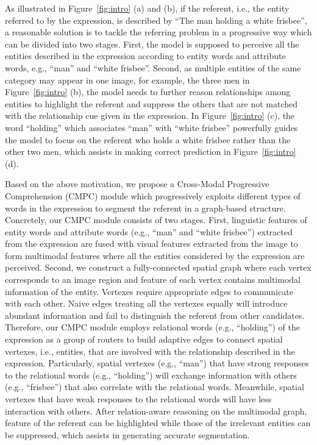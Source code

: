 \documentclass[10pt,twocolumn,letterpaper]{article}
\begin{document}
As illustrated in Figure~\ref{fig:intro} (a) and (b), 
if the referent, i.e., the entity referred to by the expression, is described by 
``The man holding a white frisbee'', a reasonable solution is to tackle the referring 
problem in a progressive way which can be divided into two stages. First, the model is supposed to 
perceive all the entities described in the expression according to entity words and 
attribute words, e.g., ``man'' and ``white frisbee''. Second, as multiple entities of the 
same category may appear in one image, for example, the three men in Figure~\ref{fig:intro} (b), 
the model needs to further reason relationships among entities to highlight the referent 
and suppress the others that are not matched with the relationship cue given in the expression. 
In Figure~\ref{fig:intro} (c), the word ``holding'' which associates ``man'' with ``white frisbee'' 
powerfully guides the model to focus on the referent who holds a white frisbee rather than the other two men, which assists in making correct prediction in Figure~\ref{fig:intro} (d).

Based on the above motivation, we propose a Cross-Modal Progressive Comprehension (CMPC) 
module which progressively exploits different types of words in the expression to segment the referent 
in a graph-based structure. Concretely, our CMPC module consists of two stages. 
First, linguistic features of entity words and attribute words 
(e.g., ``man'' and ``white frisbee'') extracted from 
the expression are fused with visual features extracted from the image to form 
multimodal features where all the entities considered by the expression are perceived. 
Second, we construct a fully-connected spatial graph where each vertex corresponds to an 
image region and feature of each vertex contains multimodal information of the entity. 
Vertexes require appropriate edges to communicate with each other. Naive edges treating 
all the vertexes equally will introduce abundant information and fail to distinguish the referent from other candidates. 
Therefore, our CMPC module employs relational words (e.g., ``holding'') of the expression as a group of routers 
to build adaptive edges to connect spatial vertexes, i.e., entities, that are involved with 
the relationship described in the expression. Particularly, spatial vertexes (e.g., ``man'') that have 
strong responses to the relational words (e.g., ``holding'') will exchange information with others (e.g., ``frisbee'') that also correlate with the 
relational words. Meanwhile, spatial vertexes that have weak responses to the relational words 
will have less interaction with others. After relation-aware reasoning on the multimodal 
graph, feature of the referent can be highlighted while those of the irrelevant 
entities can be suppressed, which assists in generating accurate segmentation.
\end{document}
